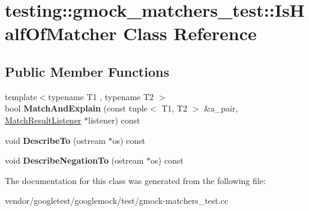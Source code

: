 \hypertarget{classtesting_1_1gmock__matchers__test_1_1_is_half_of_matcher}{}\section{testing\+:\+:gmock\+\_\+matchers\+\_\+test\+:\+:Is\+Half\+Of\+Matcher Class Reference}
\label{classtesting_1_1gmock__matchers__test_1_1_is_half_of_matcher}
\subsection*{Public Member Functions}
\begin{DoxyCompactItemize}
\item 
\mbox{\label{classtesting_1_1gmock__matchers__test_1_1_is_half_of_matcher_a8c919d71f6f7e05ac76c67f37107808c}} 
{\footnotesize template$<$typename T1 , typename T2 $>$ }\\bool {\bfseries Match\+And\+Explain} (const tuple$<$ T1, T2 $>$ \&a\+\_\+pair, \mbox{\hyperlink{classtesting_1_1_match_result_listener}{Match\+Result\+Listener}} $\ast$listener) const
\item 
\mbox{\label{classtesting_1_1gmock__matchers__test_1_1_is_half_of_matcher_aaf62b9984288cc339599286352d82e91}} 
void {\bfseries Describe\+To} (ostream $\ast$os) const
\item 
\mbox{\label{classtesting_1_1gmock__matchers__test_1_1_is_half_of_matcher_a759ba45c89acfa77a4e1afe95e7b768d}} 
void {\bfseries Describe\+Negation\+To} (ostream $\ast$os) const
\end{DoxyCompactItemize}


The documentation for this class was generated from the following file\+:\begin{DoxyCompactItemize}
\item 
vendor/googletest/googlemock/test/gmock-\/matchers\+\_\+test.\+cc\end{DoxyCompactItemize}
